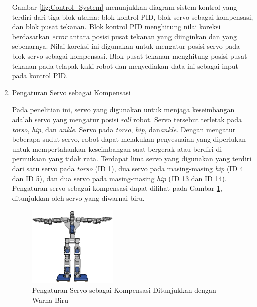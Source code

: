 \begin{enumerate}[label=\Alph*.]
    \hspace*{1em}  Gambar \ref{fig:Control_System} menunjukkan diagram sistem kontrol yang terdiri dari tiga blok utama: blok kontrol PID, blok servo sebagai kompensasi, dan blok pusat tekanan. Blok kontrol PID menghitung nilai koreksi berdasarkan \textit{error} antara posisi pusat tekanan yang diinginkan dan yang sebenarnya. Nilai koreksi ini digunakan untuk mengatur posisi servo pada blok servo sebagai kompensasi. Blok pusat tekanan menghitung posisi pusat tekanan pada telapak kaki robot dan menyediakan data ini sebagai input pada kontrol PID.

    \item Pengaturan Servo sebagai Kompensasi
    \label{subsec:servosettings}

    \hspace*{1em} Pada penelitian ini, servo yang digunakan untuk menjaga keseimbangan adalah servo yang mengatur posisi \textit{roll} robot. Servo tersebut terletak pada \textit{torso}, \textit{hip}, dan \textit{ankle}. Servo pada \textit{torso}, \textit{hip}, dan\textit{ankle}. Dengan mengatur beberapa sudut servo, robot dapat melakukan penyesuaian yang diperlukan untuk mempertahankan keseimbangan saat bergerak atau berdiri di permukaan yang tidak rata. Terdapat lima servo yang digunakan yang terdiri dari satu servo pada \textit{torso} (ID 1), dua servo pada masing-masing \textit{hip} (ID 4 dan ID 5), dan dua servo pada masing-masing \textit{hip} (ID 13 dan ID 14). Pengaturan servo sebagai kompensasi dapat dilihat pada Gambar \ref{fig:Controlled_Servo}, ditunjukkan oleh servo yang diwarnai biru.

    \begin{figure} [h] \centering
      \includegraphics[width=0.4\textwidth]{gambar/controlled_servo.png}
      \caption{Pengaturan Servo sebagai Kompensasi Ditunjukkan dengan Warna Biru}
      \label{fig:Controlled_Servo}
    \end{figure}

    \hspace*{1em} 
\end{enumerate}
